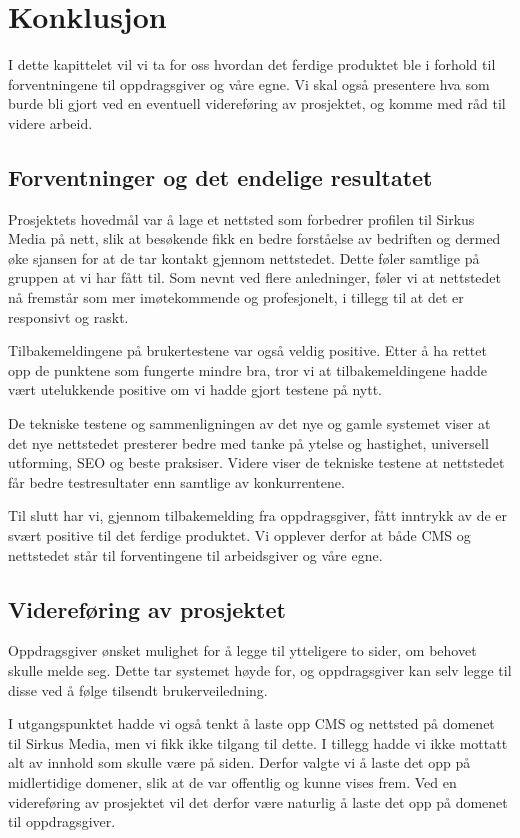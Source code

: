 \cleardoublepage
\chapter{Konklusjon}
\label{chap:conclusion} 

I dette kapittelet vil vi ta for oss hvordan det ferdige produktet ble i forhold til forventningene til oppdragsgiver og våre egne.  Vi skal også presentere hva som burde bli gjort ved en eventuell videreføring av prosjektet, og komme med råd til videre arbeid.

\section{Forventninger og det endelige resultatet}
Prosjektets hovedmål var å lage et nettsted som forbedrer profilen til Sirkus Media på nett, slik at besøkende fikk en bedre forståelse av bedriften og dermed øke sjansen for at de tar kontakt gjennom nettstedet. Dette føler samtlige på gruppen at vi har fått til. Som nevnt ved flere anledninger, føler vi at nettstedet nå fremstår som mer imøtekommende og profesjonelt, i tillegg til at det er responsivt og raskt.

Tilbakemeldingene på brukertestene var også veldig positive. Etter å ha rettet opp de punktene som fungerte mindre bra, tror vi at tilbakemeldingene hadde vært utelukkende positive om vi hadde gjort testene på nytt. 

De tekniske testene og sammenligningen av det nye og gamle systemet viser at det nye nettstedet presterer bedre med tanke på ytelse og hastighet, universell utforming, SEO og beste praksiser. Videre viser de tekniske testene at nettstedet får bedre testresultater enn samtlige av konkurrentene.

Til slutt har vi, gjennom tilbakemelding fra oppdragsgiver, fått inntrykk av de er svært positive til det ferdige produktet. Vi opplever derfor at både CMS og nettstedet står til forventingene til arbeidsgiver og våre egne.

\section{Videreføring av prosjektet}
Oppdragsgiver ønsket mulighet for å legge til ytteligere to sider, om behovet skulle melde seg. Dette tar systemet høyde for, og oppdragsgiver kan selv legge til disse ved å følge tilsendt brukerveiledning.

I utgangspunktet hadde vi også tenkt å laste opp CMS og nettsted på domenet til Sirkus Media, men vi fikk ikke tilgang til dette. I tillegg hadde vi ikke mottatt alt av innhold som skulle være på siden. Derfor valgte vi å laste det opp på midlertidige domener, slik at de var offentlig og kunne vises frem. Ved en videreføring av prosjektet vil det derfor være naturlig å laste det opp på domenet til oppdragsgiver.

